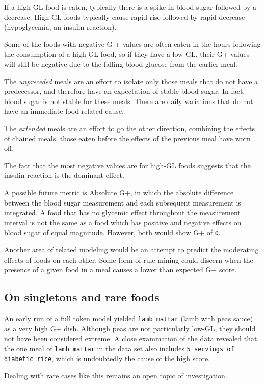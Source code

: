 \documentclass[conference]{IEEEtran}
\begin{document}
If a high-GL food is eaten, typically there is a spike in blood sugar followed by a decrease. High-GL foods typically cause rapid rise followed by rapid decrease (hypoglycemia, an insulin reaction).

Some of the foods with negative G + values are often eaten in the hours following the consumption of a high-GL food, so if they have a low-GL, their G+ values will still be negative due to the falling blood glucose from the earlier meal.

The \emph{unpreceded} meals are an effort to isolate only those meals that do not have a predecessor, and therefore have an expectation of stable blood sugar. In fact, blood sugar is not stable for these meals. There are daily variations that do not have an immediate food-related cause.

The \emph{extended} meals are an effort to go the other direction, combining the effects of chained meals, those eaten before the effects of the previous meal have worn off.

The fact that the most negative values are for high-GL foods suggests that the insulin reaction is the dominant effect.

A possible future metric is Absolute G+, in which the absolute difference between the blood sugar measurement and each subsequent measurement is integrated. A food that has no glycemic effect throughout the measurement interval is not the same as a food which has positive and negative effects on blood sugar of equal magnitude. However, both would show G+ of \texttt{0}.

Another area of related modeling would be an attempt to predict the moderating effects of foods on each other. Some form of rule mining could discern when the presence of a given food in a meal causes a lower than expected G+ score.

\subsection{On singletons and rare foods}

An early run of a full token model yielded \texttt{lamb mattar} (lamb with peas sauce) as a very high G+ dish. Although peas are not particularly low-GL, they should not have been considered extreme. A close examination of the data revealed that the one meal of \texttt{lamb mattar} in the data set also includes \texttt{5 servings of diabetic rice}, which is undoubtedly the cause of the high score.

Dealing with rare cases like this remains an open topic of investigation.




\vspace{12pt}
\end{document}
